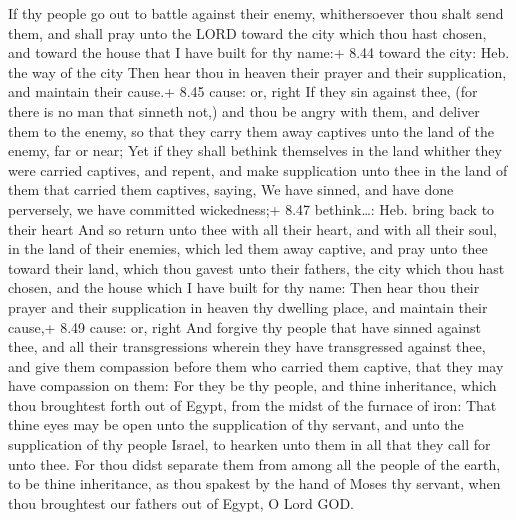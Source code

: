  If thy people go out to battle against their enemy,
whithersoever thou shalt send them, and shall pray unto the LORD toward
the city which thou hast chosen, and toward the house that I have built
for thy name:+ 8.44 toward the city: Heb. the way of the city
 Then hear thou in heaven their prayer and their
supplication, and maintain their cause.+ 8.45 cause: or, right
 If they sin against thee, (for there is no man that
sinneth not,) and thou be angry with them, and deliver them to the
enemy, so that they carry them away captives unto the land of the enemy,
far or near;  Yet if they shall bethink themselves in the
land whither they were carried captives, and repent, and make
supplication unto thee in the land of them that carried them captives,
saying, We have sinned, and have done perversely, we have committed
wickedness;+ 8.47 bethink\ldots: Heb. bring back to their heart
 And so return unto thee with all their heart, and with all
their soul, in the land of their enemies, which led them away captive,
and pray unto thee toward their land, which thou gavest unto their
fathers, the city which thou hast chosen, and the house which I have
built for thy name:  Then hear thou their prayer and their
supplication in heaven thy dwelling place, and maintain their cause,+
8.49 cause: or, right  And forgive thy people that have
sinned against thee, and all their transgressions wherein they have
transgressed against thee, and give them compassion before them who
carried them captive, that they may have compassion on them:
 For they be thy people, and thine inheritance, which thou
broughtest forth out of Egypt, from the midst of the furnace of iron:
 That thine eyes may be open unto the supplication of thy
servant, and unto the supplication of thy people Israel, to hearken unto
them in all that they call for unto thee.  For thou didst
separate them from among all the people of the earth, to be thine
inheritance, as thou spakest by the hand of Moses thy servant, when thou
broughtest our fathers out of Egypt, O Lord GOD.

